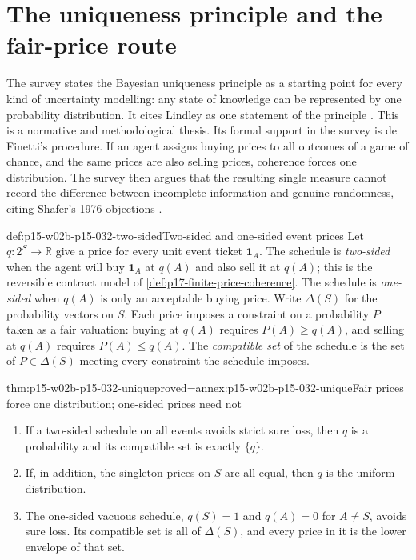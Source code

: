 \section{The uniqueness principle and the fair-price route}
\label{sec:p15-w02b-p15-032-uniqueness}

The survey states the Bayesian uniqueness principle as a starting point
for every kind of uncertainty modelling: any state of knowledge can be
represented by one probability distribution. It cites Lindley as one
statement of the principle \cite[p.~310]{DuboisPrade2021RepresentingBelief}
\cite{R47Lindley1982}. This is a normative and methodological thesis. Its
formal support in the survey is de Finetti's procedure. If an agent assigns
buying prices to all outcomes of a game of chance, and the same prices
are also selling prices, coherence forces one distribution. The survey
then argues that the resulting single measure cannot record the
difference between incomplete information and genuine randomness, citing
Shafer's 1976 objections \cite[p.~310]{DuboisPrade2021RepresentingBelief}.

\begin{hbdefinition}{def:p15-w02b-p15-032-two-sided}{Two-sided and one-sided event prices}
Let \(q:2^S\to\mathbb R\) give a price for every unit event ticket
\(\mathbf 1_A\). The schedule is \emph{two-sided} when the agent will buy
\(\mathbf 1_A\) at \(q(A)\) and also sell it at \(q(A)\); this is the
reversible contract model of \cref{def:p17-finite-price-coherence}.
The schedule is \emph{one-sided} when \(q(A)\) is only an acceptable
buying price. Write \(\Delta(S)\) for the probability vectors on \(S\).
Each price imposes a constraint on a probability \(P\) taken as a fair
valuation: buying at \(q(A)\) requires \(P(A)\geq q(A)\), and selling at
\(q(A)\) requires \(P(A)\leq q(A)\). The \emph{compatible set} of the
schedule is the set of \(P\in\Delta(S)\) meeting every constraint the
schedule imposes.
\end{hbdefinition}

\begin{hbtheorem}{thm:p15-w02b-p15-032-unique}{proved=annex:p15-w02b-p15-032-unique}{Fair prices force one distribution; one-sided prices need not}
\begin{enumerate}
\item If a two-sided schedule on all events avoids strict sure loss, then
  \(q\) is a probability and its compatible set is exactly \(\{q\}\).
\item If, in addition, the singleton prices on \(S\) are all equal, then
  \(q\) is the uniform distribution.
\item The one-sided vacuous schedule, \(q(S)=1\) and \(q(A)=0\) for
  \(A\neq S\), avoids sure loss. Its compatible set is all of
  \(\Delta(S)\), and every price in it is the lower envelope of that set.
\end{enumerate}
\end{hbtheorem}

